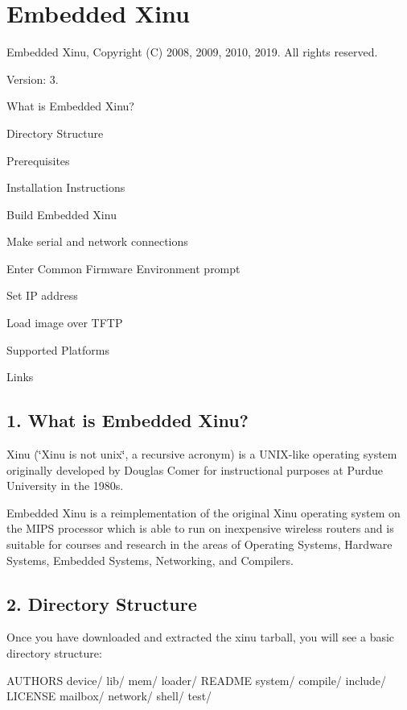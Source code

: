 \section*{Embedded Xinu}

Embedded Xinu, Copyright (C) 2008, 2009, 2010, 2019. All rights reserved.

Version\-: 3.


\begin{DoxyEnumerate}
\item What is Embedded Xinu?
\item Directory Structure
\item Prerequisites
\item Installation Instructions
\begin{DoxyEnumerate}
\item Build Embedded Xinu
\item Make serial and network connections
\item Enter Common Firmware Environment prompt
\item Set I\-P address
\item Load image over T\-F\-T\-P
\end{DoxyEnumerate}
\item Supported Platforms
\item Links
\end{DoxyEnumerate}

\subsection*{1. What is Embedded Xinu?}

Xinu (\char`\"{}\-Xinu is not unix\char`\"{}, a recursive acronym) is a U\-N\-I\-X-\/like operating system originally developed by Douglas Comer for instructional purposes at Purdue University in the 1980s.

Embedded Xinu is a reimplementation of the original Xinu operating system on the M\-I\-P\-S processor which is able to run on inexpensive wireless routers and is suitable for courses and research in the areas of Operating Systems, Hardware Systems, Embedded Systems, Networking, and Compilers.

\subsection*{2. Directory Structure}

Once you have downloaded and extracted the xinu tarball, you will see a basic directory structure\-: \begin{DoxyVerb}AUTHORS   device/   lib/     mem/      loader/   README  system/
compile/  include/  LICENSE  mailbox/  network/  shell/  test/
\end{DoxyVerb}



